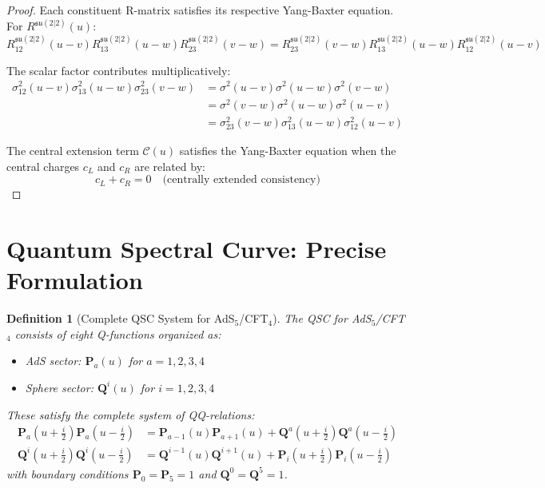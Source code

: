 \documentclass[11pt]{article}
\newtheorem{definition}{Definition}
\begin{document}
\begin{proof}
Each constituent R-matrix satisfies its respective Yang-Baxter equation. For $R^{\mathfrak{su}(2|2)}(u)$:
\begin{equation}
R^{\mathfrak{su}(2|2)}_{12}(u-v) R^{\mathfrak{su}(2|2)}_{13}(u-w) R^{\mathfrak{su}(2|2)}_{23}(v-w) = R^{\mathfrak{su}(2|2)}_{23}(v-w) R^{\mathfrak{su}(2|2)}_{13}(u-w) R^{\mathfrak{su}(2|2)}_{12}(u-v)
\end{equation}

The scalar factor contributes multiplicatively:
\begin{align}
\sigma^2_{12}(u-v) \sigma^2_{13}(u-w) \sigma^2_{23}(v-w) &= \sigma^2(u-v) \sigma^2(u-w) \sigma^2(v-w) \\
&= \sigma^2(v-w) \sigma^2(u-w) \sigma^2(u-v) \\
&= \sigma^2_{23}(v-w) \sigma^2_{13}(u-w) \sigma^2_{12}(u-v)
\end{align}

The central extension term $\mathcal{C}(u)$ satisfies the Yang-Baxter equation when the central charges $c_L$ and $c_R$ are related by:
\begin{equation}
c_L + c_R = 0 \quad \text{(centrally extended consistency)}
\end{equation}
\end{proof}

\section{Quantum Spectral Curve: Precise Formulation}

\begin{definition}[Complete QSC System for AdS$_5$/CFT$_4$]
The QSC for AdS$_5$/CFT$_4$ consists of eight Q-functions organized as:
\begin{itemize}
\item AdS sector: $\mathbf{P}_a(u)$ for $a = 1,2,3,4$
\item Sphere sector: $\mathbf{Q}^i(u)$ for $i = 1,2,3,4$  
\end{itemize}
These satisfy the complete system of QQ-relations:
\begin{align}
\mathbf{P}_a(u+\frac{i}{2}) \mathbf{P}_a(u-\frac{i}{2}) &= \mathbf{P}_{a-1}(u) \mathbf{P}_{a+1}(u) + \mathbf{Q}^{a}(u+\frac{i}{2}) \mathbf{Q}^{a}(u-\frac{i}{2}) \\
\mathbf{Q}^i(u+\frac{i}{2}) \mathbf{Q}^i(u-\frac{i}{2}) &= \mathbf{Q}^{i-1}(u) \mathbf{Q}^{i+1}(u) + \mathbf{P}_{i}(u+\frac{i}{2}) \mathbf{P}_{i}(u-\frac{i}{2})
\end{align}
with boundary conditions $\mathbf{P}_0 = \mathbf{P}_5 = 1$ and $\mathbf{Q}^0 = \mathbf{Q}^5 = 1$.
\end{definition}
\end{document}
